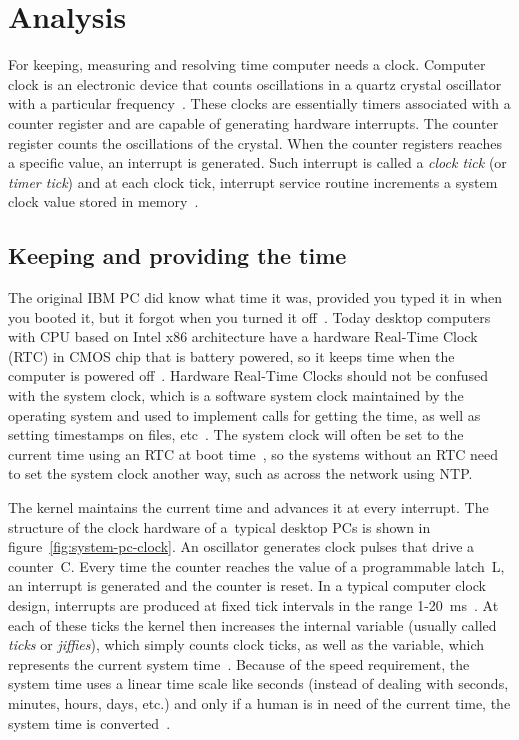 
\chapter{Analysis}
For keeping, measuring and resolving time computer needs a clock.
Computer clock is an electronic device that counts oscillations in a
quartz crystal oscillator with a particular frequency~\cite{thesis-sync}.
These clocks are essentially timers associated with a counter register and
are capable of generating hardware interrupts.
The counter register counts the oscillations of the crystal.
When the counter registers reaches a specific value,
an interrupt is generated.
Such interrupt is called a {\it{clock tick}} (or {\it{timer tick}}) and at each clock tick,
interrupt service routine increments a system clock value stored in memory~\cite{thesis-sync}.

\section{Keeping and providing the time}\label{sec:system-keeping-and-providing}
The original IBM PC did know what time it was, provided you typed it in when you booted it,
but it forgot when you turned it off~\cite{timecounters}.
Today desktop computers with CPU based on Intel x86 architecture
have a hardware Real-Time Clock (RTC) in CMOS chip that is battery powered,
so it keeps time when the computer is powered off~\cite{timecounters}.
Hardware Real-Time Clocks should not be confused with the system clock,
which is a software system clock maintained by
the operating system and used to implement calls for getting the time,
as well as setting timestamps on files, etc~\cite{linux-man-rtc}.
The system clock will often be set to the current time using an RTC at boot time~\cite{linux-man-rtc},
so the systems without an RTC need to set the system clock another way,
such as across the network using NTP.

The kernel maintains the current time and advances it at every interrupt.
The structure of the clock hardware of a~typical desktop PCs is shown in figure~\ref{fig:system-pc-clock}.
An oscillator generates clock pulses that drive a counter~C.
Every time the counter reaches the value of a programmable latch~L,
an interrupt is generated and the counter is reset.
In a typical computer clock design, interrupts are produced at
fixed tick intervals in the range 1-20~ms~\cite{nanokernel}.
At each of these ticks the kernel then increases the internal variable
(usually called {\it{ticks}} or {\it{jiffies}}), which simply counts clock ticks,
as well as the variable, which represents the current system time~\cite{thesis-beat}.
Because of the speed requirement,
the system time uses a linear time scale like seconds
(instead of dealing with seconds, minutes, hours, days, etc.)
and only if a human is in need of the current time,
the system time is converted~\cite{ntp-faq}.

